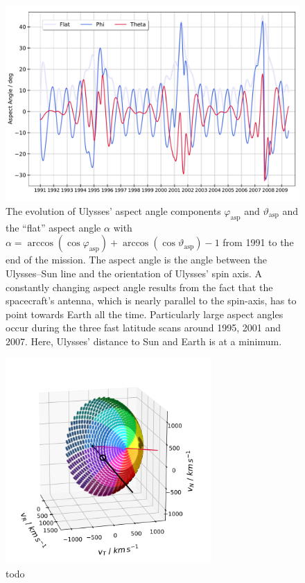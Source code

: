 \begin{figure}[h]
	\includegraphics[width=1\textwidth]{Figures/aaa.pdf}
	\centering
	\caption{The evolution of Ulysses' aspect angle components $\varphi_{\mathrm{asp}}$ and $\vartheta_{\mathrm{asp}}$ and the ``flat'' aspect angle $\alpha$ with  $\alpha = \arccos(\cos{\varphi_{\mathrm{asp}}}) + \arccos(\cos{\vartheta_{\mathrm{asp}}}) -1$ from 1991 to the end of the mission. The aspect angle is the angle between the Ulysses--Sun line and the orientation of Ulysses' spin axis. A constantly changing aspect angle results from the fact that the spacecraft's antenna, which is nearly parallel to the spin-axis, has to point towards Earth all the time. Particularly large aspect angles occur during the three fast latitude scans around 1995, 2001 and 2007. Here, Ulysses' distance to Sun and Earth is at a minimum.}
	\label{fig:aa}
\end{figure}
\begin{figure}[h]
	\includegraphics[width=0.7\textwidth]{Figures/col_aa_marker.png}
	\centering
	\caption{todo}
	\label{fig:col_aa}
\end{figure}
